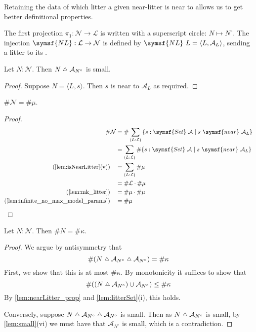\begin{remark}
    Retaining the data of which litter a given near-litter is near to allows us to get better definitional properties.
\end{remark}
\begin{definition}
    The first projection \( \pi_1 : \mathcal N \to \mathcal L \) is written with a superscript circle: \( N \mapsto N^\circ \).
    The injection \( \symsf{NL} : \mathcal L \to \mathcal N \) is defined by \( \symsf{NL}\ L = \langle L, \mathcal A_L \rangle \), sending a litter to its .
\end{definition}
\begin{lemma}
    \label{lem:nearLitter_prop}
    Let \( N : \mathcal N \).
    Then \( N \symmdiff \mathcal A_{N^\circ} \) is small.
\end{lemma}
\begin{proof}
    Suppose \( N = \langle L, s \rangle \).
    Then \( s \) is near to \( \mathcal A_L \) as required.
\end{proof}
\begin{lemma}
    \label{lem:mk_nearLitter}
    \( \#\mathcal N = \#\mu \).
\end{lemma}
\begin{proof}
    \begin{align*}
        \#\mathcal N &= \#\sum_{(L : \mathcal L)} \qty{s : \symsf{Set}\ \mathcal A \mid s\ \symsf{near}\ \mathcal A_L} \\
        &= \sum_{(L : \mathcal L)} \#\qty{s : \symsf{Set}\ \mathcal A \mid s\ \symsf{near}\ \mathcal A_L} \\
        (\text{\cref{lem:isNearLitter}(v)}) \quad &= \sum_{(L : \mathcal L)} \#\mu \\
        &= \#\mathcal L \cdot \#\mu \\
        (\text{\cref{lem:mk_litter}}) \quad &= \#\mu \cdot \#\mu \\
        (\text{\cref{lem:infinite_no_max_model_params}}) \quad &= \#\mu
    \end{align*}
\end{proof}
\begin{lemma}
    \label{lem:mk_nearLitter''}
    Let \( N : \mathcal N \).
    Then \( \#N = \#\kappa \).
\end{lemma}
\begin{proof}
    We argue by antisymmetry that
    \[ \#(N \symmdiff \mathcal A_{N^\circ} \symmdiff \mathcal A_{N^\circ}) = \#\kappa \]
    First, we show that this is at most \( \#\kappa \).
    By monotonicity it suffices to show that
    \[ \#((N \symmdiff \mathcal A_{N^\circ}) \cup \mathcal A_{N^\circ}) \leq \#\kappa \]
    By \cref{lem:nearLitter_prop} and \cref{lem:litterSet}(i), this holds.

    Conversely, suppose \( N \symmdiff \mathcal A_{N^\circ} \symmdiff \mathcal A_{N^\circ} \) is small.
    Then as \( N \symmdiff \mathcal A_{N^\circ} \) is small, by \cref{lem:small}(vi) we must have that \( \mathcal A_{N^\circ} \) is small, which is a contradiction.
\end{proof}
